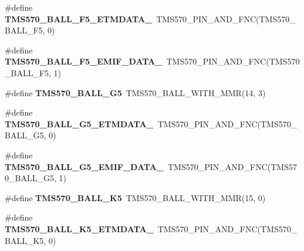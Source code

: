 \begin{DoxyCompactItemize}
\item 
\mbox{\label{tms570lc4357-pins_8h_a7a4157873929e40b849c076693bb7411}} 
\#define {\bfseries T\+M\+S570\+\_\+\+B\+A\+L\+L\+\_\+\+F5\+\_\+\+E\+T\+M\+D\+A\+T\+A\+\_}~T\+M\+S570\+\_\+\+P\+I\+N\+\_\+\+A\+N\+D\+\_\+\+F\+NC(T\+M\+S570\+\_\+\+B\+A\+L\+L\+\_\+\+F5, 0)
\item 
\mbox{\label{tms570lc4357-pins_8h_ae0ba1b421a1a881180d316969c7a4ff0}} 
\#define {\bfseries T\+M\+S570\+\_\+\+B\+A\+L\+L\+\_\+\+F5\+\_\+\+E\+M\+I\+F\+\_\+\+D\+A\+T\+A\+\_}~T\+M\+S570\+\_\+\+P\+I\+N\+\_\+\+A\+N\+D\+\_\+\+F\+NC(T\+M\+S570\+\_\+\+B\+A\+L\+L\+\_\+\+F5, 1)
\item 
\mbox{\label{tms570lc4357-pins_8h_aa807257fad8648aa995a450521f50448}} 
\#define {\bfseries T\+M\+S570\+\_\+\+B\+A\+L\+L\+\_\+\+G5}~T\+M\+S570\+\_\+\+B\+A\+L\+L\+\_\+\+W\+I\+T\+H\+\_\+\+M\+MR(14, 3)
\item 
\mbox{\label{tms570lc4357-pins_8h_abfff88d10497a39688738be1507a4797}} 
\#define {\bfseries T\+M\+S570\+\_\+\+B\+A\+L\+L\+\_\+\+G5\+\_\+\+E\+T\+M\+D\+A\+T\+A\+\_}~T\+M\+S570\+\_\+\+P\+I\+N\+\_\+\+A\+N\+D\+\_\+\+F\+NC(T\+M\+S570\+\_\+\+B\+A\+L\+L\+\_\+\+G5, 0)
\item 
\mbox{\label{tms570lc4357-pins_8h_a4dc7b77db456a3158f4e3509056e4ac1}} 
\#define {\bfseries T\+M\+S570\+\_\+\+B\+A\+L\+L\+\_\+\+G5\+\_\+\+E\+M\+I\+F\+\_\+\+D\+A\+T\+A\+\_}~T\+M\+S570\+\_\+\+P\+I\+N\+\_\+\+A\+N\+D\+\_\+\+F\+NC(T\+M\+S570\+\_\+\+B\+A\+L\+L\+\_\+\+G5, 1)
\item 
\mbox{\label{tms570lc4357-pins_8h_a70d2ed5d9f0efadd3ac7497498dc0df9}} 
\#define {\bfseries T\+M\+S570\+\_\+\+B\+A\+L\+L\+\_\+\+K5}~T\+M\+S570\+\_\+\+B\+A\+L\+L\+\_\+\+W\+I\+T\+H\+\_\+\+M\+MR(15, 0)
\item 
\mbox{\label{tms570lc4357-pins_8h_a20f37516b2349e0aa06a2b7d159d04c3}} 
\#define {\bfseries T\+M\+S570\+\_\+\+B\+A\+L\+L\+\_\+\+K5\+\_\+\+E\+T\+M\+D\+A\+T\+A\+\_}~T\+M\+S570\+\_\+\+P\+I\+N\+\_\+\+A\+N\+D\+\_\+\+F\+NC(T\+M\+S570\+\_\+\+B\+A\+L\+L\+\_\+\+K5, 0)
\item 
\mbox{\label{tms570lc4357-pins_8h_a5ff478ff7b11a909df27dd3a0e7e74c6}} 

\end{DoxyCompactItemize}
